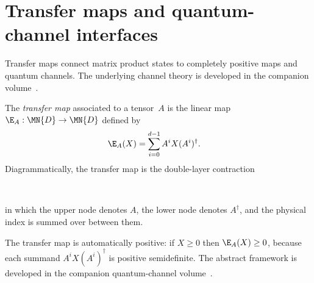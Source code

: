 \section{Transfer maps and quantum-channel interfaces}\label{sec:channels}\label{ch:channels}

Transfer maps connect matrix product states to completely positive maps and
quantum channels. The underlying channel theory is developed in the companion
volume~\cite[``Positive map'' and ``Quantum channel'']{QICLean2026Blueprint}.

\begin{definition}\label{def:transfer_map}
    \leanok
    The \emph{transfer map} associated to a tensor~$A$ is the
    linear map $\E_A : \MN{D} \to \MN{D}$ defined by
    \begin{align}
        \E_A(X)
         & = \sum_{i=0}^{d-1} A^i X (A^i)^\dagger.
        \label{eq:mps_transfer_map}
    \end{align}
    Diagrammatically, the transfer map is the double-layer contraction
    \begin{center}
        \tenkzkernel
        \begin{tenkz}[rows={ket,bra}, cols=1, west=open, east={cup=$X$}]
             \\
        \end{tenkz}
    \end{center}
    in which the upper node denotes $A$, the lower node denotes $A^\dagger$,
    and the physical index is summed over between them.
\end{definition}

\begin{remark}\leanok
    The transfer map is automatically positive: if $X \ge 0$ then
    $\E_A(X) \ge 0$, because each summand $A^i X (A^i)^\dagger$ is
    positive semidefinite. The abstract framework is developed in the companion quantum-channel
    volume~\cite[``Positive map'']{QICLean2026Blueprint}.
\end{remark}

